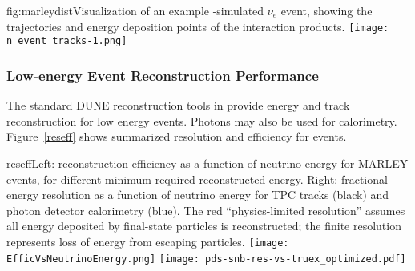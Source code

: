 \begin{dunefigure}{fig:marleydist}{Visualization of an
    example -simulated $\nu_e$ event, showing the trajectories and energy
    deposition points of the interaction products. }
\texttt{[image: n\_event\_tracks-1.png]}
\end{dunefigure}


\subsubsection{Low-energy Event Reconstruction Performance}

The standard DUNE reconstruction tools in  provide
energy and track reconstruction for
low energy events.  Photons may also be used for calorimetry.
Figure~\ref{reseff} shows summarized resolution and efficiency for
 events.

\begin{dunefigure}{reseff}{Left:
    reconstruction efficiency as a function of neutrino energy for
    MARLEY events, for different minimum required reconstructed
    energy. Right: fractional energy resolution as a function of
    neutrino energy for TPC tracks (black) and photon detector
    calorimetry (blue). The red ``physics-limited resolution'' assumes
  all energy deposited by final-state particles is reconstructed; the
  finite resolution represents loss of energy from escaping particles.}
\texttt{[image: EfficVsNeutrinoEnergy.png]}
\texttt{[image: pds-snb-res-vs-truex\_optimized.pdf]}
\end{dunefigure}



\subsubsection{ }\label{snowglobes}

